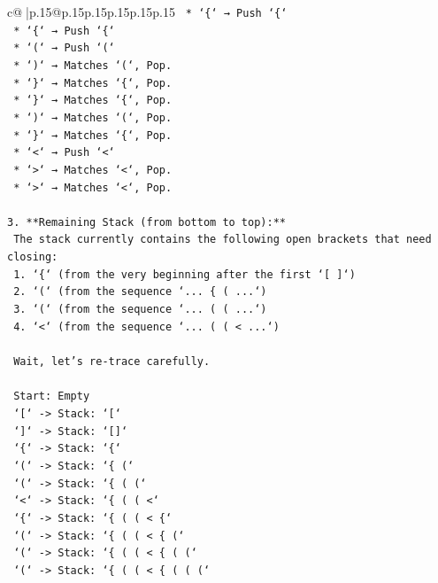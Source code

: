 \documentclass{article}
\begin{document}
{\begin{supertabular}{c@{$\;$}|p{.15\linewidth}@{}p{.15\linewidth}p{.15\linewidth}p{.15\linewidth}p{.15\linewidth}p{.15\linewidth}}
{{{\texttt{    *   `\{` → Push `\{`} \\
\texttt{    *   `\{` → Push `\{`} \\
\texttt{    *   `(` → Push `(`} \\
\texttt{    *   `)` → Matches `(`, Pop.} \\
\texttt{    *   `\}` → Matches `\{`, Pop.} \\
\texttt{    *   `\}` → Matches `\{`, Pop.} \\
\texttt{    *   `)` → Matches `(`, Pop.} \\
\texttt{    *   `\}` → Matches `\{`, Pop.} \\
\texttt{    *   `<` → Push `<`} \\
\texttt{    *   `>` → Matches `<`, Pop.} \\
\texttt{    *   `>` → Matches `<`, Pop.} \\
\\ 
\texttt{3.  **Remaining Stack (from bottom to top):**} \\
\texttt{    The stack currently contains the following open brackets that need closing:} \\
\texttt{    1.  `\{` (from the very beginning after the first `{[} {]}`)} \\
\texttt{    2.  `(` (from the sequence `... \{ ( ...`)} \\
\texttt{    3.  `(` (from the sequence `... ( ( ...`)} \\
\texttt{    4.  `<` (from the sequence `... ( ( < ...`)} \\
\\ 
\texttt{    Wait, let's re{-}trace carefully.} \\
\\ 
\texttt{    Start: Empty} \\
\texttt{    `{[}` {-}> Stack: `{[}`} \\
\texttt{    `{]}` {-}> Stack: `{[}{]}`} \\
\texttt{    `\{` {-}> Stack: `\{`} \\
\texttt{    `(` {-}> Stack: `\{ (`} \\
\texttt{    `(` {-}> Stack: `\{ ( (`} \\
\texttt{    `<` {-}> Stack: `\{ ( ( <`} \\
\texttt{    `\{` {-}> Stack: `\{ ( ( < \{`} \\
\texttt{    `(` {-}> Stack: `\{ ( ( < \{ (`} \\
\texttt{    `(` {-}> Stack: `\{ ( ( < \{ ( (`} \\
\texttt{    `(` {-}> Stack: `\{ ( ( < \{ ( ( (`} \\
}}}
\end{supertabular}}
\end{document}
